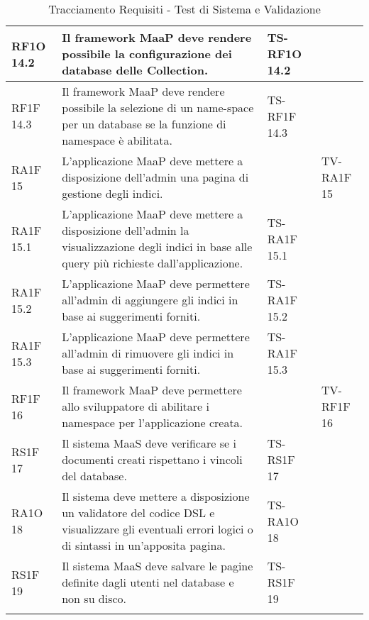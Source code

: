\begin{center}
\begin{longtable}{| p{2cm} | p{6cm} | p{2.5cm} | p{2.5cm} | }
        RF1O 14.2 & 
        Il framework MaaP deve rendere possibile la configurazione dei database delle Collection. & TS-RF1O 14.2 & \\ \hline 
        RF1F 14.3 & 
        Il framework MaaP deve rendere possibile la selezione di un name-space per un database se la funzione di namespace è abilitata. & TS-RF1F 14.3 & \\ \hline 
        RA1F 15 & 
        L’applicazione MaaP deve mettere a disposizione dell’admin una pagina di gestione degli indici. &  & TV-RA1F 15 \\ \hline 
        RA1F 15.1 & 
        L’applicazione MaaP deve mettere a disposizione dell’admin la visualizzazione degli indici in base alle query più richieste dall’applicazione. & TS-RA1F 15.1 & \\ \hline 
        RA1F 15.2 & 
        L’applicazione MaaP deve permettere all’admin di aggiungere gli indici in base ai suggerimenti forniti. & TS-RA1F 15.2 & \\ \hline 
        RA1F 15.3 & 
        L’applicazione MaaP deve permettere all’admin di rimuovere gli indici in base ai suggerimenti forniti. & TS-RA1F 15.3 & \\ \hline 
        RF1F 16 & 
        Il framework MaaP deve permettere allo sviluppatore di abilitare i namespace per l’applicazione creata. &  & TV-RF1F 16 \\ \hline 
        RS1F 17 & 
        Il sistema MaaS deve verificare se i documenti creati rispettano i vincoli del database. & TS-RS1F 17 & \\ \hline 
        RA1O 18 & 
        Il sistema deve mettere a disposizione un validatore del codice DSL e visualizzare gli eventuali errori logici o di sintassi in un'apposita pagina. & TS-RA1O 18 & \\ \hline 
        RS1F 19 & 
        Il sistema MaaS deve salvare le pagine definite dagli utenti nel database e non su disco. & TS-RS1F 19 & \\ \hline 
    \caption{Tracciamento Requisiti - Test di Sistema e Validazione}
    \end{longtable}
   \egroup
\end{center}
\clearpage
